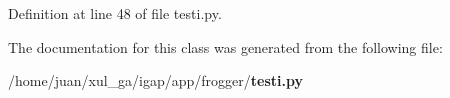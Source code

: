 \subsubsection{}\label{classapp_1_1frogger_1_1testi_1_1SDLPanel_70366720cba025457a84ffbe4a7629e2}




Definition at line 48 of file testi.py.

The documentation for this class was generated from the following file:\begin{CompactItemize}
\item 
/home/juan/xul\_\-ga/igap/app/frogger/{\bf testi.py}\end{CompactItemize}
